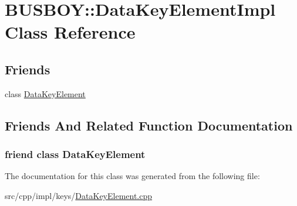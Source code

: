 \hypertarget{classBUSBOY_1_1DataKeyElementImpl}{
\section{BUSBOY::DataKeyElementImpl Class Reference}
\label{classBUSBOY_1_1DataKeyElementImpl}
}
\subsection*{Friends}
\begin{DoxyCompactItemize}
\item 
class \hyperlink{classBUSBOY_1_1DataKeyElementImpl_a8652cde5baefb8ae00b76d1850abc06f}{DataKeyElement}
\end{DoxyCompactItemize}


\subsection{Friends And Related Function Documentation}
\hypertarget{classBUSBOY_1_1DataKeyElementImpl_a8652cde5baefb8ae00b76d1850abc06f}{
\subsubsection[{DataKeyElement}]{\setlength{\rightskip}{0pt plus 5cm}friend class {\bf DataKeyElement}}}
\label{classBUSBOY_1_1DataKeyElementImpl_a8652cde5baefb8ae00b76d1850abc06f}


The documentation for this class was generated from the following file:\begin{DoxyCompactItemize}
\item 
src/cpp/impl/keys/\hyperlink{DataKeyElement_8cpp}{DataKeyElement.cpp}\end{DoxyCompactItemize}
